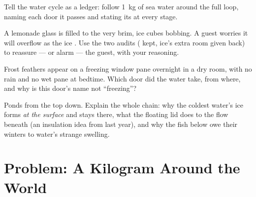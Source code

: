 \begin{exercise}[$\star\star$]\label{exo:g6:water-states:9}
Tell the water cycle as a ledger: follow \qty{1}{kg} of sea water
around the full loop, naming each door it passes and stating its
 at every stage.
\end{exercise}

\begin{exercise}[$\star\star$]\label{exo:g6:water-states:10}
A lemonade glass is filled to the very brim, ice cubes bobbing.
A guest worries it will overflow as the ice . Use the two
audits ( kept, ice's extra room given back) to reassure ---
or alarm --- the guest, with your reasoning.
\end{exercise}

\begin{exercise}[$\star\star$]\label{exo:g6:water-states:11}
Frost feathers appear on a freezing window pane overnight in a dry
room, with no rain and no wet pane at bedtime. Which door did the
water take, from where, and why is this door's name not
``freezing''?
\end{exercise}

\begin{exercise}[$\star\star\star$]\label{exo:g6:water-states:12}
Ponds  from the top down. Explain the whole chain: why the
coldest water's ice forms \emph{at the surface} and stays there,
what the floating lid does to the  flow beneath (an insulation
idea from last year), and why the fish below owe their winters to
water's strange swelling.
\end{exercise}

\section{Problem: A Kilogram Around the World}

